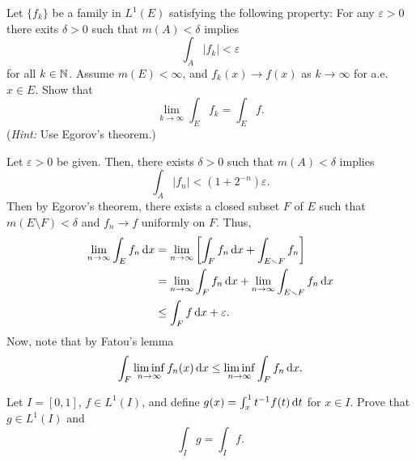\begin{problem}
  Let \(\{f_k\}\) be a family in \(L^1(E)\) satisfying the following
  property: For any \(\varepsilon>0\) there exits \(\delta>0\) such that
  \(m(A)<\delta\) implies
  \[
    \int_A |f_k|<\varepsilon
  \]
  for all \(k\in\mathbb{N}\). Assume \(m(E)<\infty\), and \(f_k(x)\to f(x)\) as
  \(k\to\infty\) for a.e.\@ \(x\in E\). Show that
  \[
    \lim_{k\to\infty}\int_E f_k=\int_E f.
  \]
  (\emph{Hint:} Use Egorov's theorem.)
\end{problem}
\begin{solution}
  Let \(\varepsilon>0\) be given. Then, there exists \(\delta>0\) such that
  \(m(A)<\delta\) implies
  \[
    \int_A|f_n|<\left(1+2^{-n}\right)\varepsilon.
  \]
  Then by Egorov's theorem, there exists a closed subset \(F\) of \(E\)
  such that \(m(E\setminus F)<\delta\) and \(f_n\to f\) uniformly on
  \(F\). Thus,
  \begin{align*}
    \lim_{n\to\infty}\int_E f_n\mathop{}\!\mathrm{d} x
    &=\lim_{n\to\infty}
      \left[\int_F f_n\mathop{}\!\mathrm{d} x
      +\int_{E\smallsetminus F}f_n\right]\\
    &=\lim_{n\to\infty}\int_F f_n\mathop{}\!\mathrm{d} x+
      \lim_{n\to\infty}\int_{E\smallsetminus F}f_n\mathop{}\!\mathrm{d} x\\
    &\leq\int_F f\mathop{}\!\mathrm{d} x+\varepsilon.
  \end{align*}
  Now, note that by Fatou's lemma
  \[
    \int_F\liminf_{n\to\infty}f_n(x)\mathop{}\!\mathrm{d} x
    \leq \liminf_{n\to\infty}\int_F f_n\mathop{}\!\mathrm{d} x.
  \]
\end{solution}

\begin{problem}
  Let \(I=[0,1]\), \(f\in L^1(I)\), and define
  \(g(x)=\int_x^1 t^{-1}f(t) \mathop{}\!\mathrm{d} t\) for \(x\in I\). Prove that
  \(g\in L^1(I)\) and
  \[
    \int_I g=\int_I f.
  \]
\end{problem}
\begin{solution}
\end{solution}


